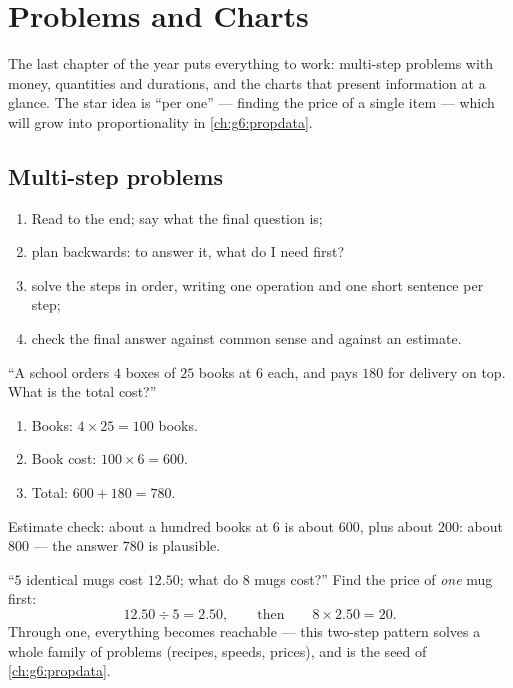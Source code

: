 \chapter{Problems and Charts}\label{ch:g5:data}

The last chapter of the year puts everything to work: multi-step
problems with money, quantities and durations, and the charts that
present information at a glance. The star idea is ``per one'' ---
finding the price of a single item --- which will grow into
proportionality in \cref{ch:g6:propdata}.

\section{Multi-step problems}

\begin{method}\label{met:g5:data:steps}
\begin{enumerate}
  \item Read to the end; say what the final question is;
  \item plan backwards: to answer it, what do I need first?
  \item solve the steps in order, writing one operation and one
        short sentence per step;
  \item check the final answer against common sense and against an
        estimate.
\end{enumerate}
\end{method}

\begin{example}\label{ex:g5:data:multistep}
``A school orders $4$ boxes of $25$ books at $6$ each, and pays
$180$ for delivery on top. What is the total cost?''
\begin{enumerate}
  \item Books: $4 \times 25 = 100$ books.
  \item Book cost: $100 \times 6 = 600$.
  \item Total: $600 + 180 = 780$.
\end{enumerate}
Estimate check: about a hundred books at $6$ is about $600$, plus
about $200$: about $800$ --- the answer $780$ is plausible.
\end{example}

\begin{example}\label{ex:g5:data:perone}
``$5$ identical mugs cost $12.50$; what do $8$ mugs cost?''
Find the price of \emph{one} mug first:
\[
12.50 \div 5 = 2.50,
\qquad\text{then}\qquad
8 \times 2.50 = 20 .
\]
Through one, everything becomes reachable --- this two-step pattern
solves a whole family of problems (recipes, speeds, prices), and is
the seed of \cref{ch:g6:propdata}.
\end{example}

